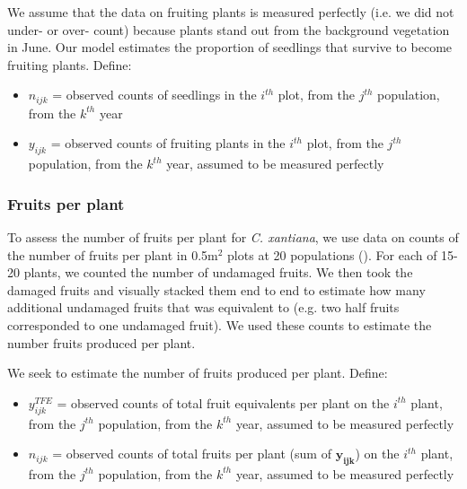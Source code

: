 \documentclass[12pt, oneside, titlepage]{article}   	%
\begin{document}
We assume that the data on fruiting plants is measured perfectly (i.e. we did not under- or over- count) because plants stand out from the background vegetation in June. Our model estimates the proportion of seedlings that survive to become fruiting plants. Define:

\begin{itemize}
	\item $n_{ijk}$ = observed counts of seedlings in the $i^{th}$ plot, from the $j^{th}$ population, from the $k^{th}$ year
	\item $y_{ijk}$ = observed counts of fruiting plants in the $i^{th}$ plot, from the $j^{th}$ population, from the $k^{th}$ year, assumed to be measured perfectly
\end{itemize}

\subsubsection*{Fruits per plant}

To assess the number of fruits per plant for \textit{C. xantiana}, we use data on counts of the number of fruits per plant in 0.5m$^2$ plots at 20 populations (\cite{eckhart2011}). For each of 15-20 plants, we counted the number of undamaged fruits. We then took the damaged fruits and visually stacked them end to end to estimate how many additional undamaged fruits that was equivalent to (e.g. two half fruits corresponded to one undamaged fruit). We used these counts to estimate the number fruits produced per plant. 


We seek to estimate the number of fruits produced per plant. Define: 

\begin{itemize}

	\item $y^{TFE}_{ijk}$ = observed counts of total fruit equivalents per plant on the $i^{th}$ plant, from the $j^{th}$ population, from the $k^{th}$ year, assumed to be measured perfectly
	\item $n_{ijk}$ = observed counts of total fruits per plant (sum of $\bm{y_{ijk}}$) on the $i^{th}$ plant, from the $j^{th}$ population, from the $k^{th}$ year, assumed to be measured perfectly
\end{itemize}
\end{document}
